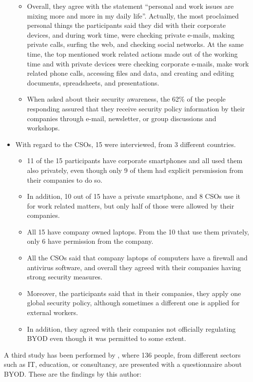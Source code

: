 \begin{itemize}
\begin{itemize}
		\item Overall, they agree with the statement ``personal and work issues are mixing more and more in my daily life''. Actually, the most proclaimed personal things the participants said they did with their corporate devices, and during work time, were checking private e-mails, making private calls, surfing the web, and checking social networks. At the same time, the top mentioned work related actions made out of the working time and with private devices were checking corporate e-mails, make work related phone calls, accessing files and data, and creating and editing documents, spreadsheets, and presentations.
		\item When asked about their security awareness, the 62\% of the people responding assured that they receive security policy information by their companies through e-mail, newsletter, or group discussions and workshops.
	\end{itemize}
	\item With regard to the CSOs, 15 were interviewed, from 3 different countries.
	\begin{itemize}
		\item 11 of the 15 participants have corporate smartphones and all used them also privately, even though only 9 of them had explicit persmission from their companies to do so.
		\item In addition, 10 out of 15 have a private smartphone, and 8 CSOs use it for work related matters, but only half of those were allowed by their companies.
		\item All 15 have company owned laptops. From the 10 that use them privately, only 6 have permission from the company.
		\item All the CSOs said that company laptops of computers have a firewall and antivirus software, and overall they agreed with their companies having strong security measures.
		\item Moreover, the participants said that in their companies, they apply one global security policy, although sometimes a different one is applied for external workers.
		\item In addition, they agreed with their companies not officially regulating BYOD even though it was permitted to some extent.
	\end{itemize}
\end{itemize}

A third study has been performed by \cite{singh2012byod}, where 136 people, from different sectors such as IT, education, or consultancy, are presented with a questionnaire about BYOD. These are the findings by this author:

